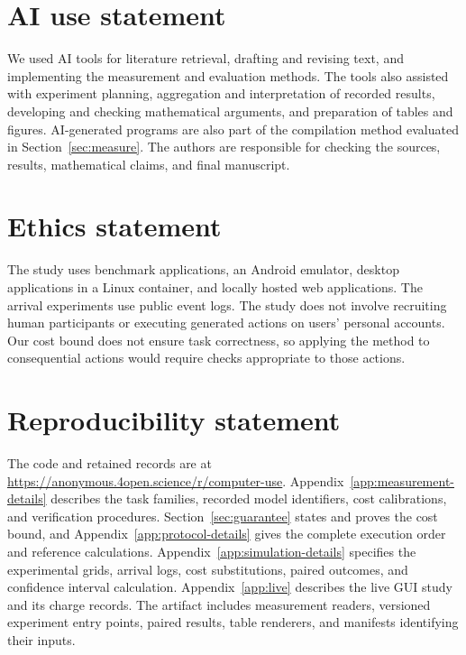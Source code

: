 \section*{AI use statement}
\label{sec:ai-use}
We used AI tools for literature retrieval, drafting and revising text, and implementing the measurement and evaluation methods.
The tools also assisted with experiment planning, aggregation and interpretation of recorded results, developing and checking mathematical arguments, and preparation of tables and figures.
AI-generated programs are also part of the compilation method evaluated in Section~\ref{sec:measure}.
The authors are responsible for checking the sources, results, mathematical claims, and final manuscript.

\section*{Ethics statement}
\label{sec:ethics}
The study uses benchmark applications, an Android emulator, desktop applications in a Linux container, and locally hosted web applications.
The arrival experiments use public event logs.
The study does not involve recruiting human participants or executing generated actions on users' personal accounts.
Our cost bound does not ensure task correctness, so applying the method to consequential actions would require checks appropriate to those actions.

\section*{Reproducibility statement}
\label{sec:reproducibility}
The code and retained records are at \url{https://anonymous.4open.science/r/computer-use}.
Appendix~\ref{app:measurement-details} describes the task families, recorded model identifiers, cost calibrations, and verification procedures.
Section~\ref{sec:guarantee} states and proves the cost bound, and Appendix~\ref{app:protocol-details} gives the complete execution order and reference calculations.
Appendix~\ref{app:simulation-details} specifies the experimental grids, arrival logs, cost substitutions, paired outcomes, and confidence interval calculation.
Appendix~\ref{app:live} describes the live GUI study and its charge records.
The artifact includes measurement readers, versioned experiment entry points, paired results, table renderers, and manifests identifying their inputs.
